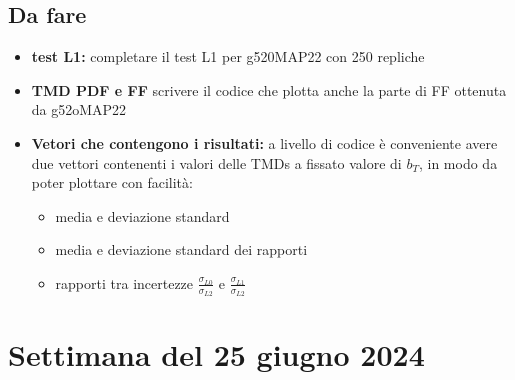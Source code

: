\documentclass{article}
\begin{document}
\subsection{Da fare}
\begin{itemize}
    \item \textbf{test L1: } completare il test L1 per g520MAP22 con 250 repliche
    \item \textbf{TMD PDF e FF} scrivere il codice che plotta anche la parte di FF ottenuta da g52oMAP22
    \item \textbf{Vetori che contengono i risultati: } a livello di codice è conveniente avere due vettori contenenti i valori delle TMDs a fissato valore di $b_T$, in modo da poter plottare con facilità: 
    \begin{itemize}
        \item media e deviazione standard
        \item media e deviazione standard dei rapporti
        \item rapporti tra incertezze $\frac{\sigma_{L0}}{\sigma_{L2}}$ e $\frac{\sigma_{L1}}{\sigma_{L2}}$ 
    \end{itemize}
\end{itemize}

\section{Settimana del 25 giugno 2024}
\end{document}
